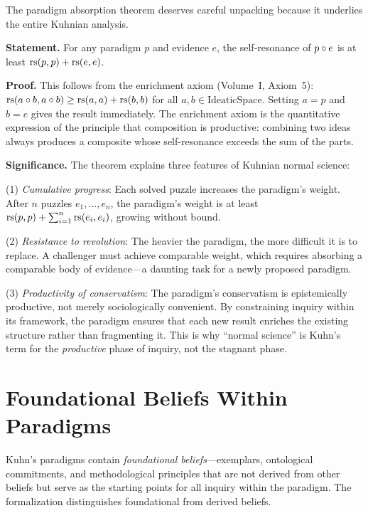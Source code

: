 \begin{remark}
The paradigm absorption theorem deserves careful unpacking because it underlies
the entire Kuhnian analysis.

\textbf{Statement.} For any paradigm $p$ and evidence $e$, the self-resonance of
$p \circ e$ is at least $\mathrm{rs}(p, p) + \mathrm{rs}(e, e)$.

\textbf{Proof.} This follows from the enrichment axiom (Volume~I, Axiom~5):
$\mathrm{rs}(a \circ b, a \circ b) \geq \mathrm{rs}(a, a) + \mathrm{rs}(b, b)$ for all
$a, b \in \mathrm{IdeaticSpace}$. Setting $a = p$ and $b = e$ gives the
result immediately. The enrichment axiom is the quantitative expression of
the principle that composition is productive: combining two ideas always
produces a composite whose self-resonance exceeds the sum of the parts.

\textbf{Significance.} The theorem explains three features of Kuhnian normal
science:

(1) \emph{Cumulative progress}: Each solved puzzle increases the paradigm's
weight. After $n$ puzzles $e_1, \ldots, e_n$, the paradigm's weight is at
least $\mathrm{rs}(p, p) + \sum_{i=1}^{n} \mathrm{rs}(e_i, e_i)$, growing without bound.

(2) \emph{Resistance to revolution}: The heavier the paradigm, the more
difficult it is to replace. A challenger must achieve comparable weight,
which requires absorbing a comparable body of evidence---a daunting task
for a newly proposed paradigm.

(3) \emph{Productivity of conservatism}: The paradigm's conservatism is
epistemically productive, not merely sociologically convenient. By constraining
inquiry within its framework, the paradigm ensures that each new result
enriches the existing structure rather than fragmenting it. This is why
``normal science'' is Kuhn's term for the \emph{productive} phase of inquiry,
not the stagnant phase.
\end{remark}

\section{Foundational Beliefs Within Paradigms}

Kuhn's paradigms contain \emph{foundational beliefs}---exemplars, ontological
commitments, and methodological principles that are not derived from other
beliefs but serve as the starting points for all inquiry within the paradigm.
The formalization distinguishes foundational from derived beliefs.

